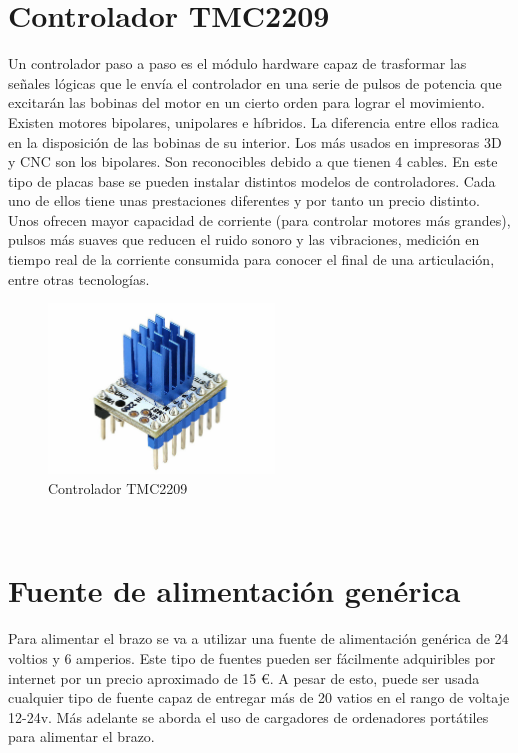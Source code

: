 \section{Controlador TMC2209}
\label{subsec:controladorPAP}
Un controlador paso a paso es el módulo hardware capaz de trasformar las señales lógicas que le envía el controlador en una serie de pulsos de
potencia que excitarán las bobinas del motor en un cierto orden para lograr el movimiento. 
Existen motores bipolares, unipolares e híbridos. La diferencia entre ellos radica en la disposición de las bobinas de su interior. Los más usados 
en impresoras 3D y CNC son los bipolares. Son reconocibles debido a que tienen 4 cables.
En este tipo de placas base se pueden instalar distintos modelos de controladores. Cada uno de ellos tiene unas prestaciones diferentes y por tanto 
un precio distinto. Unos ofrecen mayor capacidad de corriente (para controlar motores más grandes), pulsos más suaves que reducen el 
ruido sonoro y las vibraciones, medición en tiempo real de la corriente consumida para conocer el final de una articulación, entre otras tecnologías.  
\begin{figure} [h!]
    \begin{center}
      \includegraphics[width=6cm]{figs/TMC2209.jpg}
    \end{center}
    \caption{Controlador TMC2209}
    \label{fig:robSoldering}
  \end{figure}\ 

\section{Fuente de alimentación genérica}
\label{subsec:fuente_alimentacion}
Para alimentar el brazo se va a utilizar una fuente de alimentación genérica de 24 voltios y 6 amperios. Este tipo de fuentes pueden ser 
fácilmente adquiribles por internet por un precio aproximado de 15 \euro. A pesar de esto, puede ser usada cualquier tipo de fuente capaz de 
entregar más de 20 vatios en el rango de voltaje 12-24v. Más adelante se aborda el uso de cargadores de ordenadores portátiles para alimentar el 
brazo.

